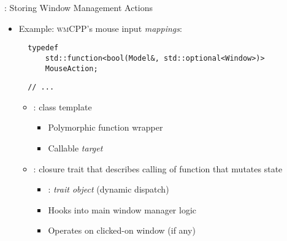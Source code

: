 \begin{frame}[fragile]{\underline{\cpp}: Storing Window Management Actions \hfill {\footnotesize \currentname}}


    \begin{itemize}

        \item Example: \textsc{wmCPP}'s mouse input \textit{mappings}:\\[3pt]
\begin{verbatim}
  typedef
      std::function<bool(Model&, std::optional<Window>)>
      MouseAction;
\end{verbatim}
\begin{verbatim}
  // ...
\end{verbatim}

    \vspace*{5pt}\begin{itemize}

        \item {}: class template
            \begin{itemize}
                \item Polymorphic function wrapper
                \item Callable \textit{target}
            \end{itemize}

        \item {}: closure trait that describes calling of function that mutates state
            \begin{itemize}
                \item {}: \textit{trait object} (dynamic dispatch)
                \item Hooks into main window manager logic
                \item Operates on clicked-on window (if any)
            \end{itemize}

    \end{itemize}

    \end{itemize}

    \vfill

\end{frame}

